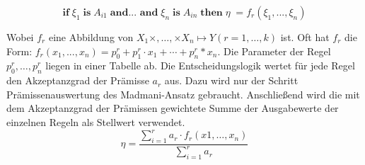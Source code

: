 \documentclass[12pt,a4paper,bibliography=totocnumbered,listof=totocnumbered, abstracton]{scrartcl}
\theoremstyle{Umgebung}
\begin{document}
\begin{equation}
\textbf{if} \; \xi_1 \; \textbf{is} \; A_{i1} \; \textbf{and... and} \; \xi_n \; \textbf{is} \; A_{in} \; \textbf{then} \; \eta \; = f_r(\xi_1,..., \xi_n)
\end{equation}

Wobei $f_r$ eine Abbildung von $X_1 \times, \dotsc, \times X_n \mapsto Y (r = 1 ,\dotsc, k)$ ist. Oft hat $f_r$ die Form: $f_r(x_1,..., x_n) = p_0^r + p_1^r \cdot x_1 + \dotsb + p_n^r * x_n$. Die Parameter der Regel $p_0^r, \dotsc, p_n^r$ liegen in einer Tabelle ab. Die Entscheidungslogik wertet für jede Regel den Akzeptanzgrad der Prämisse $a_r$ aus. Dazu wird nur der Schritt Prämissenauswertung des Madmani-Ansatz gebraucht. Anschließend wird die mit dem Akzeptanzgrad der Prämissen gewichtete Summe der Ausgabewerte der einzelnen Regeln als Stellwert verwendet.
\begin{equation}
\eta = \frac{\sum_{i=1}^{r} a_r \cdot f_r(x1, \dotsc, x_n)}{\sum_{i=1}^{r} a_r}
\end{equation}
\end{document}
